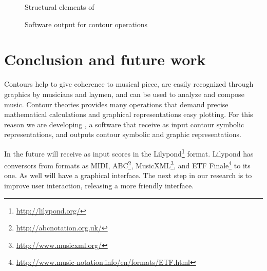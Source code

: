 \begin{figure*}
  \centering

  \caption{Structural elements of }
  \label{fig:elementos-fugato}
\end{figure*}

\begin{figure*}
  \centering
  \caption{Software output for  contour operations}
  \label{fig:output-fugato}
\end{figure*}

\section{Conclusion and future work}
\label{sec:conclusion-future-work}

Contours help to give coherence to musical piece, are easily
recognized through graphics by musicians and laymen, and can be used
to analyze and compose music. Contour theories provides many
operations that demand precise mathematical calculations and graphical
representations easy plotting. For this reason we are developing
\goiaba{}, a software that receive as input contour symbolic
representations, and outputs contour symbolic and graphic
representations.

In the future \goiaba{} will receive as input scores in the
Lilypond\footnote{\url{http://lilypond.org/}} format. Lilypond has
conversors from formats as MIDI,
ABC\footnote{\url{http://abcnotation.org.uk/}},
MusicXML\footnote{\url{http://www.musicxml.org/}}, and ETF
Finale\footnote{\url{http://www.music-notation.info/en/formats/ETF.html}}
to its one. As well \goiaba{} will have a graphical interface. The
next step in our research is to improve \goiaba{} user interaction,
releasing a more friendly interface.

